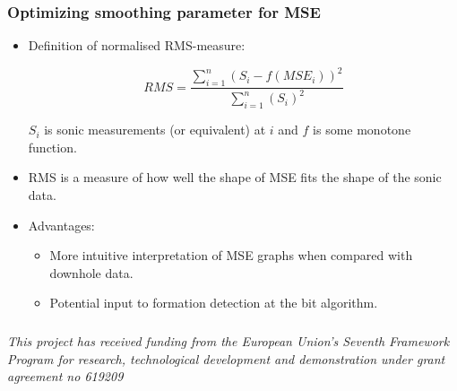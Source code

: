 \documentclass{beamer}
\begin{document}
\begin{frame} \frametitle{Optimizing smoothing parameter for MSE} 
\vspace{-1cm}

\begin{itemize}
\item<1-> Definition of normalised RMS-measure:

\begin{equation*}
RMS = \frac{\sum_{i=1}^n  (S_i - f(MSE_i))^2 }{\sum_{i=1}^n  (S_i)^2}
\end{equation*}

$S_i$ is sonic measurements (or equivalent) at $i$ and $f$ is some monotone function.  

\item<2-> RMS is a measure of how well the shape of MSE fits the shape of the sonic data.

\item<3-> Advantages:
\begin{itemize}
\item<3-> More intuitive interpretation of MSE graphs when compared with downhole data.
\item<3-> Potential input to formation detection at the bit algorithm.
\end{itemize}
\end{itemize}

\end{frame}



\begin{frame} \frametitle{} 
{\it This project has received funding from the European Union's Seventh Framework Program for research, technological development and demonstration under grant agreement no 619209}
\end{frame}
\end{document}
